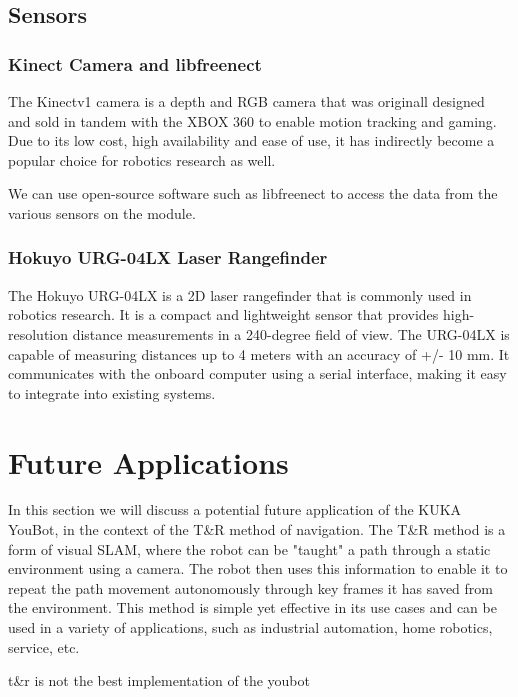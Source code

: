 \documentclass[a4paper, 12pt]{article}
\begin{document}
    \subsection{Sensors}
    \subsubsection{Kinect Camera and libfreenect}

    The Kinectv1 camera is a depth and RGB camera that was originall designed and sold in tandem with the XBOX 360 to enable motion tracking and gaming. Due to its low cost, high availability and ease of use, it has indirectly become a popular choice for robotics research as well. 

    We can use open-source software such as libfreenect to access the data from the various sensors on the module.


    \subsubsection{Hokuyo URG-04LX Laser Rangefinder}

    The Hokuyo URG-04LX is a 2D laser rangefinder that is commonly used in robotics research. It is a compact and lightweight sensor that provides high-resolution distance measurements in a 240-degree field of view. The URG-04LX is capable of measuring distances up to 4 meters with an accuracy of +/- 10 mm. It communicates with the onboard computer using a serial interface, making it easy to integrate into existing systems.

    \pagebreak

    \section{Future Applications}

    In this section we will discuss a potential future application of the KUKA YouBot, in the context of the T\&R method of navigation. The T\&R method is a form of visual SLAM, where the robot can be "taught" a path through a static environment using a camera. The robot then uses this information to enable it to repeat the path movement autonomously through key frames it has saved from the environment. This method is simple yet effective in its use cases and can be used in a variety of applications, such as industrial automation, home robotics, service, etc.

    t\&r is not the best implementation of the youbot
    
\end{document}
